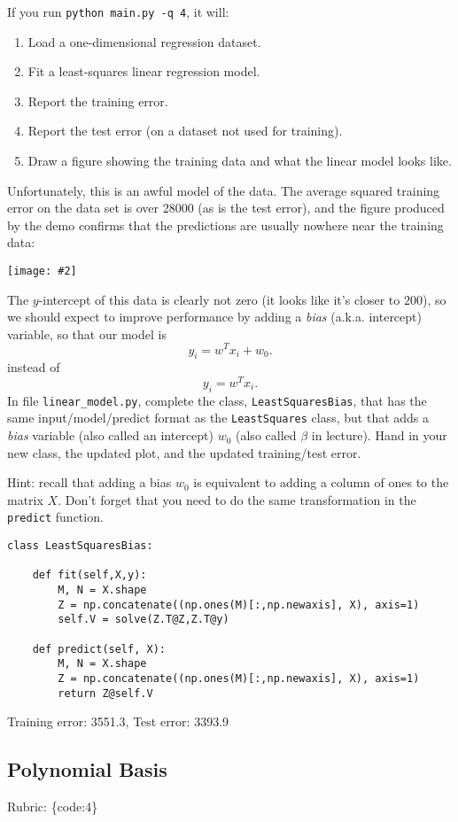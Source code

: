 \documentclass{article}
\def\rubric#1{\gre{Rubric: \{#1\}}}{}
\def\blu#1{{\color{blu}#1}}
\def\gre#1{{\color{gre}#1}}
\def\red#1{{\color{red}#1}}
\newcommand{\centerfig}[2]{\begin{center}\texttt{[image: \#2]}\end{center}}
\def\enum#1{\begin{enumerate}#1\end{enumerate}}
\begin{document}
If you run  \verb|python main.py -q 4|, it will:
\enum{
\item Load a one-dimensional regression dataset.
\item Fit a least-squares linear regression model.
\item Report the training error.
\item Report the test error (on a dataset not used for training).
\item Draw a figure showing the training data and what the linear model looks like.
}
Unfortunately, this is an awful model of the data. The average squared training error on the data set is over 28000
(as is the test error), and the figure produced by the demo confirms that the predictions are usually nowhere near
 the training data:
\centerfig{.5}{./figs/least_squares_no_bias.pdf}
The $y$-intercept of this data is clearly not zero (it looks like it's closer to $200$),
so we should expect to improve performance by adding a \emph{bias} (a.k.a. intercept) variable, so that our model is
\[
y_i = w^Tx_i + w_0.
\]
instead of
\[
y_i = w^Tx_i.
\]
\blu{In file \texttt{linear\string_model.py}, complete the class, \texttt{LeastSquaresBias},
that has the same input/model/predict format as the \texttt{LeastSquares} class,
but that adds a \emph{bias} variable (also called an intercept) $w_0$ (also called $\beta$ in lecture). Hand in your new class, the updated plot,
and the updated training/test error.}

Hint: recall that adding a bias $w_0$ is equivalent to adding a column of ones to the matrix $X$. Don't forget that you need to do the same transformation in the \texttt{predict} function.
\begin{lstlisting}
class LeastSquaresBias:

    def fit(self,X,y):
        M, N = X.shape
        Z = np.concatenate((np.ones(M)[:,np.newaxis], X), axis=1)
        self.V = solve(Z.T@Z,Z.T@y)

    def predict(self, X):
        M, N = X.shape
        Z = np.concatenate((np.ones(M)[:,np.newaxis], X), axis=1)
        return Z@self.V
\end{lstlisting}

\red{Training error: 3551.3, Test error: 3393.9}

\subsection{Polynomial Basis}
\rubric{code:4}
\end{document}
